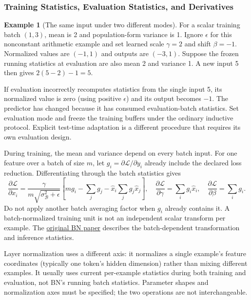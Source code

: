 \documentclass[11pt,twoside]{article}
\numberwithin{equation}{section}
\newcommand{\Loss}{\mathcal{L}}
\theoremstyle{plain}
\theoremstyle{definition}
\newtheorem{example}[theorem]{Example}
\theoremstyle{remark}
\begin{document}
\subsubsection{Training Statistics, Evaluation Statistics, and Derivatives}
\begin{example}[The same input under two different modes]
For a scalar training batch $(1,3)$, mean is 2 and population-form variance is 1. Ignore $\epsilon$ for this nonconstant arithmetic example and set learned scale $\gamma=2$ and shift $\beta=-1$. Normalized values are $(-1,1)$ and outputs are $(-3,1)$. Suppose the frozen running statistics at evaluation are also mean 2 and variance 1. A new input 5 then gives $2(5-2)-1=5$.

If evaluation incorrectly recomputes statistics from the single input 5, its normalized value is zero (using positive $\epsilon$) and its output becomes $-1$. The predictor has changed because it has consumed evaluation-batch statistics. Set evaluation mode and freeze the training buffers under the ordinary inductive protocol. Explicit test-time adaptation is a different procedure that requires its own evaluation design.
\end{example}

During training, the mean and variance depend on every batch input. For one feature over a batch of size $m$, let $g_i=\partial\Loss/\partial y_i$ already include the declared loss reduction. Differentiating through the batch statistics gives
\[
\frac{\partial\Loss}{\partial x_i}
=\frac{\gamma}{m\sqrt{\sigma_{\mathcal B}^2+\epsilon}}
\left[m g_i-\sum_j g_j-\hat x_i\sum_j g_j\hat x_j\right],
\quad
\frac{\partial\Loss}{\partial\gamma}=\sum_i g_i\hat x_i,
\quad
\frac{\partial\Loss}{\partial\beta}=\sum_i g_i.
\]
Do not apply another batch averaging factor when $g_i$ already contains it. A batch-normalized training unit is not an independent scalar transform per example. The \href{https://arxiv.org/abs/1502.03167}{original BN paper} describes the batch-dependent transformation and inference statistics.

Layer normalization uses a different axis: it normalizes a single example's feature coordinates (typically one token's hidden dimension) rather than mixing different examples. It usually uses current per-example statistics during both training and evaluation, not BN's running batch statistics. Parameter shapes and normalization axes must be specified; the two operations are not interchangeable.
\end{document}
